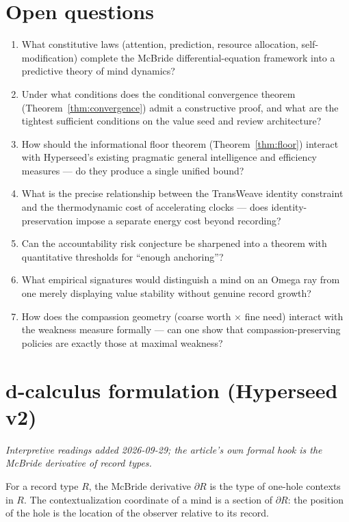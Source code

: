 \documentclass[11pt]{article}
\begin{document}
\section{Open questions}
\begin{enumerate}
  \item What constitutive laws (attention, prediction, resource allocation, self-modification) complete the McBride differential-equation framework into a predictive theory of mind dynamics?
  \item Under what conditions does the conditional convergence theorem (Theorem~\ref{thm:convergence}) admit a constructive proof, and what are the tightest sufficient conditions on the value seed and review architecture?
  \item How should the informational floor theorem (Theorem~\ref{thm:floor}) interact with Hyperseed's existing pragmatic general intelligence and efficiency measures --- do they produce a single unified bound?
  \item What is the precise relationship between the TransWeave identity constraint and the thermodynamic cost of accelerating clocks --- does identity-preservation impose a separate energy cost beyond recording?
  \item Can the accountability risk conjecture be sharpened into a theorem with quantitative thresholds for ``enough anchoring''?
  \item What empirical signatures would distinguish a mind on an Omega ray from one merely displaying value stability without genuine record growth?
  \item How does the compassion geometry (coarse worth $\times$ fine need) interact with the weakness measure formally --- can one show that compassion-preserving policies are exactly those at maximal weakness?
\end{enumerate}


\section{d-calculus formulation (Hyperseed v2)}
\emph{Interpretive readings added 2026-09-29; the article's own formal hook
is the McBride derivative of record types.}

\begin{proposition}
For a record type $R$, the McBride derivative $\partial R$ is the type of
one-hole contexts in $R$. The contextualization coordinate of a mind is a
section of $\partial R$: the position of the hole is the location of the
observer relative to its record.
\end{proposition}
\end{document}
